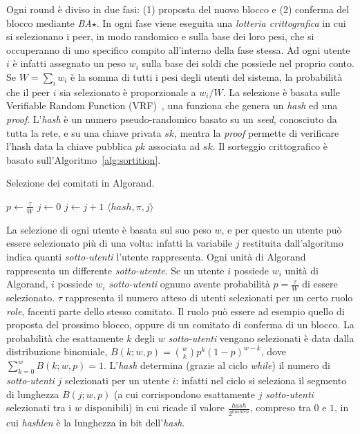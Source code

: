 Ogni round è diviso in due fasi: (1) proposta del nuovo blocco e (2) conferma del blocco mediante \emph{BA$\star$}.
In ogni fase viene eseguita una \emph{lotteria crittografica} in cui si selezionano i peer, in modo randomico e sulla base dei loro pesi, che si occuperanno di uno specifico compito all'interno della fase stessa. Ad ogni utente $i$ è infatti assegnato un peso $w_i$ sulla base dei soldi che possiede nel proprio conto. Se $W = \sum_i w_i$ è la somma di tutti i pesi degli utenti del sistema, la probabilità che il peer $i$ sia selezionato è proporzionale a $w_i/W$. La selezione è basata sulle Verifiable Random Function (VRF)~\cite{micali1999verifiable}, una funziona che genera un \emph{hash} ed una \emph{proof}. L'\emph{hash} è un numero pseudo-randomico basato su un \emph{seed}, conosciuto da tutta la rete, e su una chiave privata $sk$, mentra la \emph{proof} permette di verificare l'hash data la chiave pubblica $pk$ associata ad $sk$.
Il sorteggio crittografico è basato sull'Algoritmo~\ref{alg:sortition}.
\begin{algorithm}
	\caption{Selezione dei comitati in Algorand.}
	\begin{algorithmic}
			\State $p \leftarrow \frac{\tau}{W}$
			\State $j \leftarrow 0$
			\While{$\frac{hash}{2^{hashlen}} \notin [ \sum_{k = 0}^j B(k; w, p), \sum_{k=0}^{j+1} B(k; w, p) )$}
			\State $j \leftarrow j + 1$
			\EndWhile
			\Return $\langle hash, \pi, j \rangle$
		\EndProcedure
	\end{algorithmic}
	\label{alg:sortition}
\end{algorithm}
La selezione di ogni utente è basata sul suo peso $w$, e per questo un utente può essere selezionato più di una volta: infatti la variabile $j$ restituita dall'algoritmo indica quanti \emph{sotto-utenti} l'utente rappresenta. Ogni unità di Algorand rappresenta un differente \emph{sotto-utente}. Se un utente $i$ possiede $w_i$ unità di Algorand, $i$ possiede $w_i$ \emph{sotto-utenti} ognuno avente probabilità $p = \frac{\tau}{W}$ di essere selezionato. $\tau$ rappresenta il numero atteso di utenti selezionati per un certo ruolo \emph{role}, facenti parte dello stesso comitato. Il ruolo può essere ad esempio quello di proposta del prossimo blocco, oppure di un comitato di conferma di un blocco. La probabilità che esattamente $k$ degli $w$ \emph{sotto-utenti} vengano selezionati è data dalla distribuzione binomiale, $B(k; w, p) = \binom{w}{k} p^k (1-p)^{w-k}$, dove $\sum_{k=0}^w B(k; w, p) = 1$. L'\emph{hash} determina (grazie al ciclo \emph{while}) il numero di \emph{sotto-utenti} $j$ selezionati per un utente $i$: infatti nel ciclo si seleziona il segmento di lunghezza $B(j; w, p)$ (a cui corrispondono esattamente $j$ \emph{sotto-utenti} selezionati tra i $w$ disponibili) in cui ricade il valore $\frac{hash}{2^{hashlen}}$, compreso tra $0$ e $1$, in cui \emph{hashlen} è la lunghezza in bit dell'\emph{hash}.
